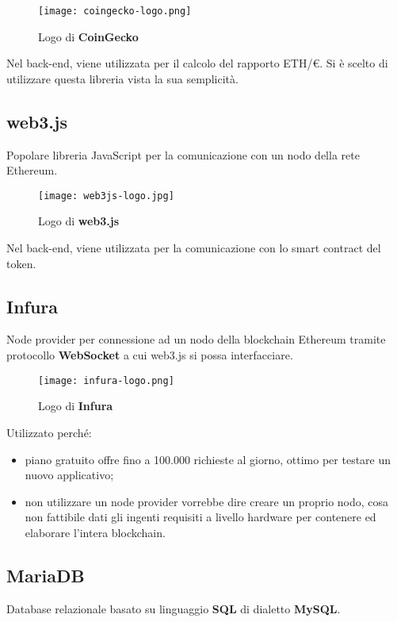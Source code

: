     \begin{figure}[h!]
        \centering
        \texttt{[image: coingecko-logo.png]}
        \caption{Logo di \textbf{CoinGecko}}
    \end{figure}

    Nel back-end, viene utilizzata per il calcolo del rapporto ETH/\euro.
    Si è scelto di utilizzare questa libreria vista la sua semplicità.

    \subsection{web3.js}
    Popolare libreria JavaScript per la comunicazione con un nodo della rete Ethereum.

    \begin{figure}[h!]
        \centering
        \texttt{[image: web3js-logo.jpg]}
        \caption{Logo di \textbf{web3.js}}
    \end{figure}

    Nel back-end, viene utilizzata per la comunicazione con lo smart contract del token.

    \subsection{Infura}
    Node provider per connessione ad un nodo della blockchain Ethereum tramite protocollo \textbf{WebSocket} a cui web3.js si possa interfacciare.

    \begin{figure}[h!]
        \centering
        \texttt{[image: infura-logo.png]}
        \caption{Logo di \textbf{Infura}}
    \end{figure}

    Utilizzato perché:
    \begin{itemize}
        \item piano gratuito offre fino a 100.000 richieste al giorno, ottimo per testare un nuovo applicativo;
        \item non utilizzare un node provider vorrebbe dire creare un proprio nodo, cosa non fattibile dati gli ingenti requisiti a livello hardware per contenere ed elaborare l'intera blockchain.
    \end{itemize}

    \subsection{MariaDB}
    \label{tech:mariadb}
    Database relazionale basato su linguaggio \textbf{SQL} di dialetto \textbf{MySQL}.

